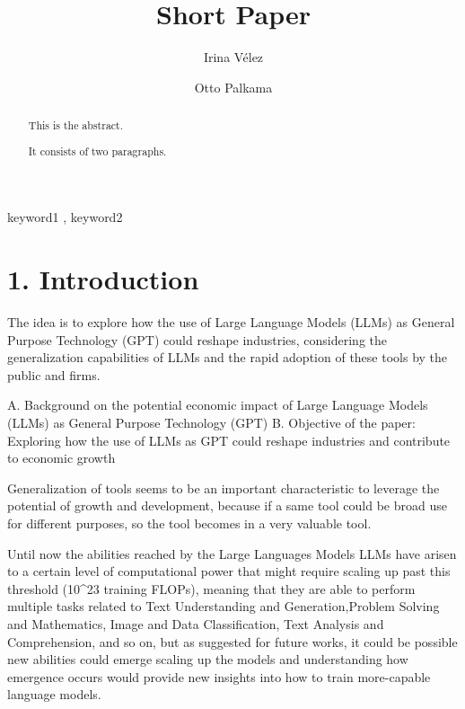 \documentclass[preprint, 3p,
authoryear]{elsarticle} %
\begin{document}
\begin{frontmatter}

  \title{Short Paper}
    \author[Some Institute of Technology]{Irina Vélez%
  }
    \author[Another University]{Otto Palkama%
  }
  
  \begin{abstract}
  This is the abstract.

  It consists of two paragraphs.
  \end{abstract}
    \begin{keyword}
    keyword1 \sep 
    keyword2
  \end{keyword}
  
 \end{frontmatter}

\hypertarget{introduction}{%
\section{1. Introduction}\label{introduction}}

The idea is to explore how the use of Large Language Models (LLMs) as
General Purpose Technology (GPT) could reshape industries, considering
the generalization capabilities of LLMs and the rapid adoption of these
tools by the public and firms.

A. Background on the potential economic impact of Large Language Models
(LLMs) as General Purpose Technology (GPT) B. Objective of the paper:
Exploring how the use of LLMs as GPT could reshape industries and
contribute to economic growth

Generalization of tools seems to be an important characteristic to
leverage the potential of growth and development, because if a same tool
could be broad use for different purposes, so the tool becomes in a very
valuable tool.

Until now the abilities reached by the Large Languages Models LLMs have
arisen to a certain level of computational power that might require
scaling up past this threshold (10\^{}23 training FLOPs), meaning that
they are able to perform multiple tasks related to Text Understanding
and Generation,Problem Solving and Mathematics, Image and Data
Classification, Text Analysis and Comprehension, and so on, but as
\citep{weiemergent} suggested for future works, it could be possible new
abilities could emerge scaling up the models and understanding how
emergence occurs would provide new insights into how to train
more-capable language models.
\end{document}
